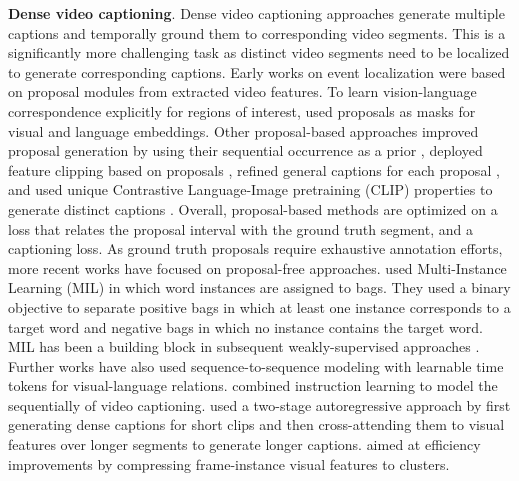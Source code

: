 \noindent
\textbf{Dense video captioning}. Dense video captioning approaches generate multiple captions and temporally ground them to corresponding video segments. This is a significantly more challenging task as distinct video segments need to be localized to generate corresponding captions. Early works on event localization \citep{krishna2017dense,li2018jointly,shi2019dense,wang2018bidirectional,zhou2018end} were based on proposal modules from extracted video features. To learn vision-language correspondence explicitly for regions of interest, \citet{zhou2018end} used proposals as masks for visual and language embeddings. Other proposal-based approaches improved proposal generation by using their sequential occurrence as a prior \citep{mun2019streamlined}, deployed feature clipping based on proposals \citep{iashin2020better,iashin2020multi}, refined general captions for each proposal \citep{deng2021sketch}, and used unique Contrastive Language-Image pretraining (CLIP) properties to generate distinct captions \citep{perrett2024s}. Overall, proposal-based methods are optimized on a loss that relates the proposal interval with the ground truth segment, and a captioning loss.%
As ground truth proposals require exhaustive annotation efforts, more recent works have focused on proposal-free approaches. \citet{shen2017weakly} used Multi-Instance Learning (MIL) in which word instances are assigned to bags. They used a binary objective to separate positive bags in which at least one instance corresponds to a target word and negative bags in which no instance contains the target word. MIL has been a building block in subsequent weakly-supervised approaches \citep{chen2021towards}. Further works \citep{yang2023vid2seq,ren2024timechat} have also used sequence-to-sequence modeling with learnable time tokens for visual-language relations. \citet{mavroudi2023learning} combined instruction learning to model the sequentially of video captioning. \citet{islam2024video} used a two-stage autoregressive approach by first generating dense captions for short clips and then cross-attending them to visual features over longer segments to generate longer captions. \citet{zhou2024streaming} aimed at efficiency improvements by compressing frame-instance visual features to clusters.


